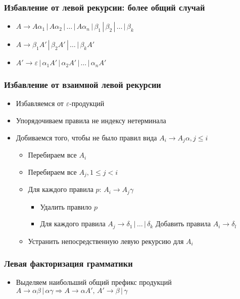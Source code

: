 \documentclass{beamer}
\begin{document}
\begin{frame}[fragile]
  \transwipe[direction=90]
  \frametitle{Избавление от левой рекурсии: более общий случай}
  \begin{itemize}
   \item $A \rightarrow A \alpha_1 \, | \, A \alpha_2 \, | \, \dots \, | \, A \alpha_n \, | \, \beta_1 \, | \, \beta_2 \, | \, \dots \, | \, \beta_k$
  \end{itemize}
  \begin{itemize}
   \item $A \rightarrow \beta_1 A' \, | \, \beta_2 A' \, | \, \dots \, | \, \beta_k A'$
   \item $A' \rightarrow \varepsilon \, | \, \alpha_1 A' \, | \, \alpha_2 A' \, | \, \dots \, | \, \alpha_n A' $
  \end{itemize}
\end{frame}

\begin{frame}[fragile]
  \transwipe[direction=90]
  \frametitle{Избавление от взаимной левой рекурсии}
  \begin{itemize}
   \item Избавляемся от $\varepsilon$-продукций
   \item Упорядочиваем правила не индексу нетерминала
   \item Добиваемся того, чтобы не было правил вида $A_i \rightarrow A_j \alpha, j \leq i$
   \begin{itemize}
     \item Перебираем все $A_i$
     \item Перебираем все $A_j, 1 \leq j < i$
     \item Для каждого правила $p: \, A_i \rightarrow A_j \gamma$
     \begin{itemize}
       \item Удалить правило $p$
       \item Для каждого правила $A_j \rightarrow \delta_1 \,|\, \dots \, | \, \delta_k$ Добавить правила $A_i \rightarrow \delta_l$
     \end{itemize}
     \item Устранить непосредственную левую рекурсию для $A_i$
   \end{itemize}
  \end{itemize}
\end{frame}

 
\begin{frame}[fragile]
  \transwipe[direction=90]
  \frametitle{Левая факторизация грамматики}
  \begin{itemize}
   \item Выделяем наибольший общий префикс продукций $A \rightarrow \alpha \beta \, | \, \alpha \gamma \Rightarrow A\rightarrow \alpha A', \, A' \rightarrow \beta \, | \, \gamma$
  \end{itemize}
\end{frame}
\end{document}
